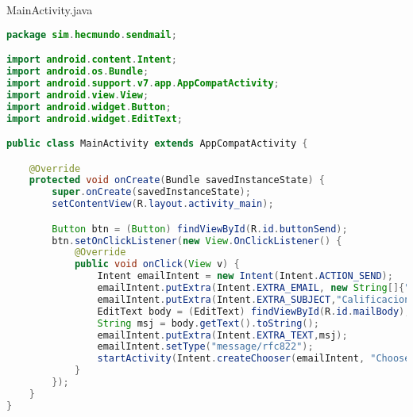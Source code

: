 \documentclass{report}
\begin{document}

MainActivity.java
\begin{lstlisting}[language=java]
package sim.hecmundo.sendmail;

import android.content.Intent;
import android.os.Bundle;
import android.support.v7.app.AppCompatActivity;
import android.view.View;
import android.widget.Button;
import android.widget.EditText;

public class MainActivity extends AppCompatActivity {

    @Override
    protected void onCreate(Bundle savedInstanceState) {
        super.onCreate(savedInstanceState);
        setContentView(R.layout.activity_main);

        Button btn = (Button) findViewById(R.id.buttonSend);
        btn.setOnClickListener(new View.OnClickListener() {
            @Override
            public void onClick(View v) {
                Intent emailIntent = new Intent(Intent.ACTION_SEND);
                emailIntent.putExtra(Intent.EXTRA_EMAIL, new String[]{"jayrosp@gmail.com"});
                emailIntent.putExtra(Intent.EXTRA_SUBJECT,"Calificaciones SIM");
                EditText body = (EditText) findViewById(R.id.mailBody);
                String msj = body.getText().toString();
                emailIntent.putExtra(Intent.EXTRA_TEXT,msj);
                emailIntent.setType("message/rfc822");
                startActivity(Intent.createChooser(emailIntent, "Choose email client..."));
            }
        });
    }
}
\end{lstlisting}
\end{document}
